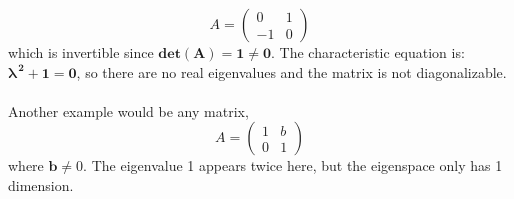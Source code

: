 \documentclass[a4paper,10pt,norsk]{article}
\begin{document}
\begin{equation*}
    A =
    \begin{pmatrix}
        0 & 1\\
        -1 & 0
    \end{pmatrix}
\end{equation*}
 which is invertible since $\mathbf{det(A) = 1 \neq{0}}$. The characteristic equation is: $\mathbf{\lambda^{\,2} + 1 = 0}$, so there are no real eigenvalues and the matrix is not diagonalizable.
\\
\\
Another example would be any matrix,
\begin{equation*}
    A =
    \begin{pmatrix}
        1 & b\\
        0 & 1
    \end{pmatrix}
\end{equation*}
where $\mathbf{b}\neq{0}$. The eigenvalue 1 appears twice here, but the eigenspace only has 1 dimension.
\end{document}
